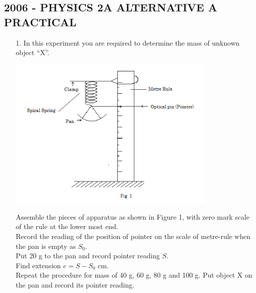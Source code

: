 \subsection{2006 - PHYSICS 2A ALTERNATIVE A PRACTICAL}

\begin{enumerate}
\item[1.] In this experiment you are required to determine the mass of unknown object ``X''.

\begin{center}
\includegraphics[width=10cm]{./img/2006-1-alt.png}
\end{center}

Assemble the pieces of apparatus as shown in Figure 1, with zero mark scale of the rule at the lower most end.\\

Record the reading of the position of pointer on the scale of metre-rule when the pan is empty as $S_0$.\\

Put 20 g to the pan and record pointer reading $S$.\\

Find extension $e = S - S_0$ cm.\\

Repeat the procedure for mass of 40 g, 60 g, 80 g and 100 g. Put object X on the pan and record its pointer reading.


\end{enumerate}
